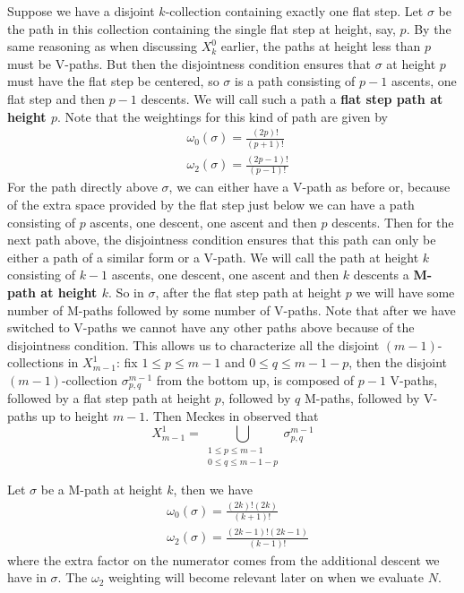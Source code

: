 \documentclass[11pt]{article}
\theoremstyle{mythm}
\begin{document}
Suppose we have a disjoint $k$-collection containing exactly one flat step. Let $\sigma$ be the path in this collection containing the single flat step at height, say, $p$. By the same reasoning as when discussing $X_k^0$ earlier, the paths at height less than $p$ must be V-paths. But then the disjointness condition ensures that $\sigma$ at height $p$ must have the flat step be centered, so $\sigma$ is a path consisting of $p-1$ ascents, one flat step and then $p-1$ descents. We will call such a path a \textbf{flat step path at height $p$}. Note that the weightings for this kind of path are given by
\begin{align*}
&\omega_0(\sigma) = \frac{(2p)!}{(p+1)!} \\
&\omega_2(\sigma) = \frac{(2p-1)!}{(p-1)!}
\end{align*}
For the path directly above $\sigma$, we can either have a V-path as before or, because of the extra space provided by the flat step just below we can have a path consisting of $p$ ascents, one descent, one ascent and then $p$ descents. Then for the next path above, the disjointness condition ensures that this path can only be either a path of a similar form or a V-path. We will call the path at height $k$ consisting of $k-1$ ascents, one descent, one ascent and then $k$ descents a \textbf{M-path at height $k$}. So in $\sigma$, after the flat step path at height $p$ we will have some number of M-paths followed by some number of V-paths. Note that after we have switched to V-paths we cannot have any other paths above because of the disjointness condition. This allows us to characterize all the disjoint $(m-1)$-collections in $X_{m-1}^1$: fix $1\leq p\leq m-1$ and $0\leq q \leq m-1-p$, then the disjoint $(m-1)$-collection $\sigma_{p,q}^{m-1}$ from the bottom up, is composed of $p-1$ V-paths, followed by a flat step path at height $p$, followed by $q$ M-paths, followed by V-paths up to height $m-1$. Then Meckes in \cite{meckes_magnitude_2019} observed that
\begin{equation*}
X_{m-1}^1 = \bigcup\limits_{\substack{1\leq p \leq m-1 \\ 0\leq q \leq m-1-p}} \sigma_{p,q}^{m-1}
\end{equation*}

Let $\sigma$ be a M-path at height $k$, then we have
\begin{align*}
&\omega_0(\sigma) = \frac{(2k)!(2k)}{(k+1)!} \\
&\omega_2(\sigma) = \frac{(2k-1)!(2k-1)}{(k-1)!}
\end{align*}
where the extra factor on the numerator comes from the additional descent we have in $\sigma$. The $\omega_2$ weighting will become relevant later on when we evaluate $N$.
\end{document}
